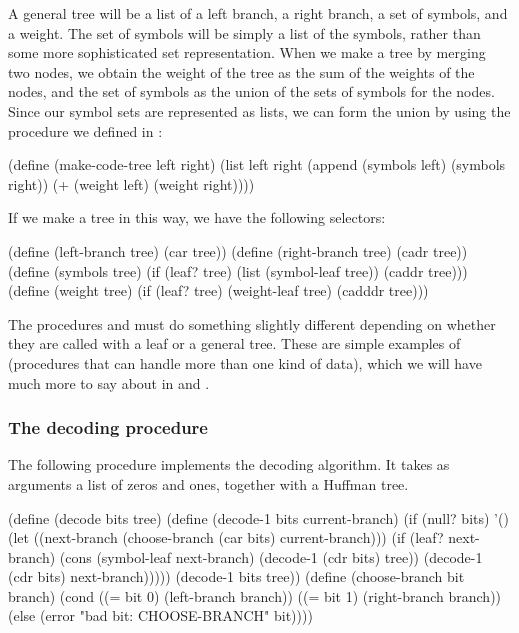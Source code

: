 \noindent
A general tree will be a list of a left branch, a right branch, a set of
symbols, and a weight.  The set of symbols will be simply a list of the
symbols, rather than some more sophisticated set representation.  When we make
a tree by merging two nodes, we obtain the weight of the tree as the sum of the
weights of the nodes, and the set of symbols as the union of the sets of
symbols for the nodes.  Since our symbol sets are represented as lists, we can
form the union by using the  procedure we defined in
:

\begin{codeBlock}
(define (make-code-tree left right)
  (list left
        right
        (append (symbols left) (symbols right))
        (+ (weight left) (weight right))))
\end{codeBlock}

\noindent
If we make a tree in this way, we have the following selectors:

\begin{codeBlock}
(define (left-branch  tree) (car  tree))
(define (right-branch tree) (cadr tree))
(define (symbols tree)
  (if (leaf? tree)
      (list (symbol-leaf tree))
      (caddr tree)))
(define (weight tree)
  (if (leaf? tree)
      (weight-leaf tree)
      (cadddr tree)))
\end{codeBlock}

\noindent
The procedures  and  must do something slightly
different depending on whether they are called with a leaf or a general tree.
These are simple examples of  (procedures that can
handle more than one kind of data), which we will have much more to say about
in  and .

\subsubsection*{The decoding procedure}

The following procedure implements the decoding algorithm.  It takes as
arguments a list of zeros and ones, together with a Huffman tree.

\begin{codeBlock}
(define (decode bits tree)
  (define (decode-1 bits current-branch)
    (if (null? bits)
        '()
        (let ((next-branch
               (choose-branch (car bits)
                              current-branch)))
          (if (leaf? next-branch)
              (cons (symbol-leaf next-branch)
                    (decode-1 (cdr bits) tree))
              (decode-1 (cdr bits) next-branch)))))
  (decode-1 bits tree))
(define (choose-branch bit branch)
  (cond ((= bit 0) (left-branch branch))
        ((= bit 1) (right-branch branch))
        (else (error "bad bit: CHOOSE-BRANCH" bit))))
\end{codeBlock}

